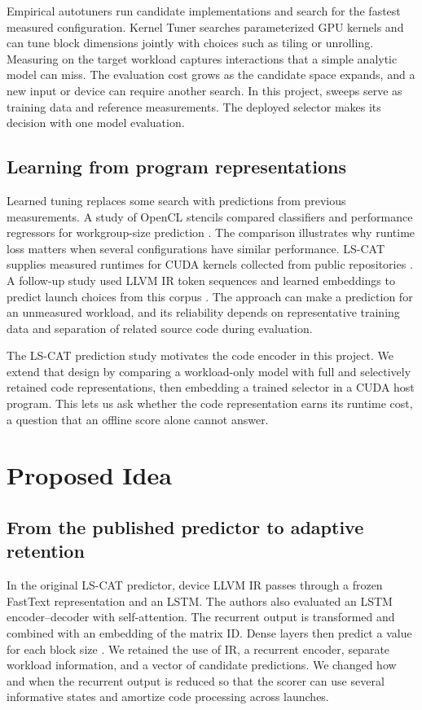 \documentclass[11pt,letterpaper]{article}
\begin{document}
Empirical autotuners run candidate implementations and search for the fastest measured configuration. Kernel
Tuner \citep{vanwerkhoven2019} searches parameterized GPU kernels and can tune block dimensions jointly with
choices such as tiling or unrolling. Measuring on the target workload captures interactions that a simple
analytic model can miss. The evaluation cost grows as the candidate space expands, and a new input or device
can require another search. In this project, sweeps serve as training data and reference measurements. The
deployed selector makes its decision with one model evaluation.

\subsection{Learning from program representations}

Learned tuning replaces some search with predictions from previous measurements. A study of OpenCL stencils
compared classifiers and performance regressors for workgroup-size prediction \citep{cummins2016}. The
comparison illustrates why runtime loss matters when several configurations have similar performance. LS-CAT
supplies measured runtimes for CUDA kernels collected from public repositories \citep{bjertnes2021a}. A
follow-up study used LLVM IR token sequences and learned embeddings to predict launch choices from this
corpus \citep{bjertnes2021b}. The approach can make a prediction for an unmeasured workload, and its
reliability depends on representative training data and separation of related source code during evaluation.

The LS-CAT prediction study motivates the code encoder in this project. We extend that design by comparing a
workload-only model with full and selectively retained code representations, then embedding a trained
selector in a CUDA host program. This lets us ask whether the code representation earns its runtime cost, a
question that an offline score alone cannot answer.

\section{Proposed Idea}

\subsection{From the published predictor to adaptive retention}

In the original LS-CAT predictor, device LLVM IR passes through a frozen FastText representation and an
LSTM. The authors also evaluated an LSTM encoder--decoder with self-attention. The recurrent output is
transformed and combined with an embedding of the matrix ID. Dense layers then predict a value for each
block size \citep{bjertnes2021b}. We retained the use of IR, a recurrent encoder, separate workload
information, and a vector of candidate predictions. We changed how and when the recurrent output is reduced
so that the scorer can use several informative states and amortize code processing across launches.
\end{document}
